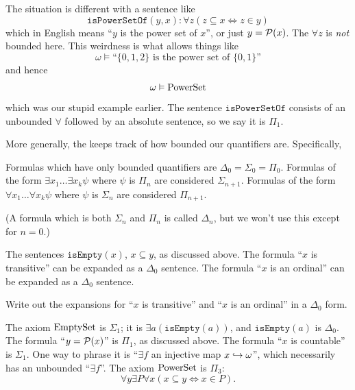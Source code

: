 The situation is different with a sentence like
\[
	\mathtt{isPowerSetOf}(y,x) :
	\forall z \left( z \subseteq x \iff z \in y  \right)
\]
which in English means ``$y$ is the power set of $x$'', or just $y = \mathcal P(x)$.
The $\forall z$ is \emph{not} bounded here.
This weirdness is what allows things like
\[ \omega \vDash \text{``$\{0,1,2\}$ is the power set of $\{0,1\}$''} \]
and hence
\[ \omega \vDash \mathrm{PowerSet} \]
which was our stupid example earlier.
The sentence $\mathtt{isPowerSetOf}$ consists of an unbounded $\forall$ followed
by an absolute sentence, so we say it is $\Pi_1$.

More generally, the  keeps track of how bounded our
quantifiers are.
Specifically,
\begin{itemize}
	\ii Formulas which have only bounded quantifiers
	are $\Delta_0 = \Sigma_0 = \Pi_0$.
	\ii Formulas of the form $\exists x_1 \dots \exists x_k \psi$
	where $\psi$ is $\Pi_n$ are considered $\Sigma_{n+1}$.
	\ii Formulas of the form $\forall x_1 \dots \forall x_k \psi$
	where $\psi$ is $\Sigma_n$ are considered $\Pi_{n+1}$.
\end{itemize}
(A formula which is both $\Sigma_n$ and $\Pi_n$ is called $\Delta_n$, but we won't
use this except for $n=0$.)

\begin{example}
	\listhack
	\begin{enumerate}[(a)]
		\ii The sentences $\mathtt{isEmpty}(x)$, $x \subseteq y$, as discussed above.
		\ii The formula ``$x$ is transitive'' can be expanded as a $\Delta_0$ sentence.
		\ii The formula ``$x$ is an ordinal'' can be expanded as a $\Delta_0$ sentence.
	\end{enumerate}
\end{example}
\begin{exercise}
	Write out the expansions for ``$x$ is transitive'' and ``$x$ is an ordinal''
	in a $\Delta_0$ form.
\end{exercise}
\begin{example}
	\listhack
	\begin{enumerate}[(a)]
		\ii The axiom $\mathrm{EmptySet}$ is $\Sigma_1$; it is $\exists a (\mathtt{isEmpty}(a))$,
		and $\mathtt{isEmpty}(a)$ is $\Delta_0$.
		\ii The formula ``$y = \mathcal P(x)$'' is $\Pi_1$, as discussed above.
		\ii The formula ``$x$ is countable'' is $\Sigma_1$.
		One way to phrase it is ``$\exists f$ an injective map $x \hookrightarrow \omega$'',
		which necessarily has an unbounded ``$\exists f$''.
		\ii The axiom $\mathrm{PowerSet}$ is $\Pi_3$:
		\[ \forall y \exists P \forall x (x\subseteq y \iff x \in P). \]
	\end{enumerate}
\end{example}

